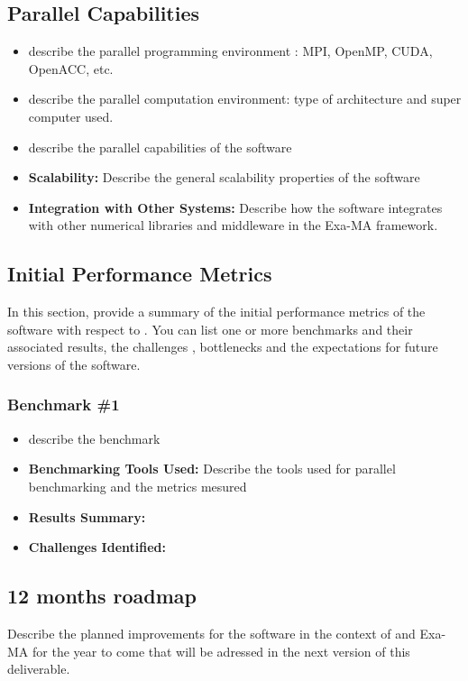 \subsection{Parallel Capabilities}
\label{sec:\VAR{wp}:\VAR{software.name}:performances}


\begin{itemize}
    \item describe the parallel programming  environment : MPI, OpenMP, CUDA, OpenACC, etc.
    \item describe the parallel computation environment: type of architecture and super computer used.
    \item describe the parallel capabilities of the software
    \item \textbf{Scalability:} Describe the general scalability properties of the software
    \item \textbf{Integration with Other Systems:} Describe how the software integrates with other numerical libraries and middleware in the Exa-MA framework.
\end{itemize}

\subsection{Initial Performance Metrics}
\label{sec:\VAR{wp}:\VAR{software.name}:metrics}

In this section, provide a summary of the initial performance metrics of the software with respect to .
You can list one or more benchmarks and their associated results, the challenges , bottlenecks and the expectations for future versions of the software.



\subsubsection{Benchmark \#1}
\begin{itemize}
    \item describe the benchmark
    \item \textbf{Benchmarking Tools Used:} Describe the tools used for parallel benchmarking and the metrics mesured
    \item \textbf{Results Summary:} 
    \item \textbf{Challenges Identified:} 
\end{itemize}

\subsection{12 months roadmap}
\label{sec:\VAR{wp}:\VAR{software.name}:roadmap}

Describe the planned improvements  for the software in the context of  and Exa-MA for the year to come that will be adressed in the next version of this deliverable.
